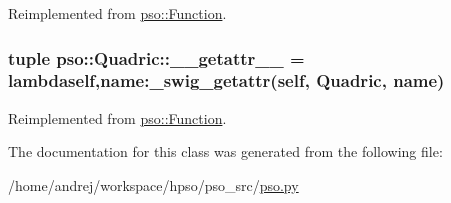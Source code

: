 Reimplemented from \hyperlink{classpso_1_1Function_5bddc07dbaab0ee579488bdcc8103a71}{pso::Function}.\hypertarget{classpso_1_1Quadric_099ef681ef278e6b714bc4597ea5dcca}{
\subsubsection{\setlength{\rightskip}{0pt plus 5cm}tuple {\bf pso::Quadric::\_\-\_\-getattr\_\-\_\-} = lambdaself,name:\_\-swig\_\-getattr(self, {\bf Quadric}, name)}}
\label{classpso_1_1Quadric_099ef681ef278e6b714bc4597ea5dcca}




Reimplemented from \hyperlink{classpso_1_1Function_affeed856b337656e88895fa35321496}{pso::Function}.

The documentation for this class was generated from the following file:\begin{CompactItemize}
\item 
/home/andrej/workspace/hpso/pso\_\-src/\hyperlink{pso_8py}{pso.py}\end{CompactItemize}
